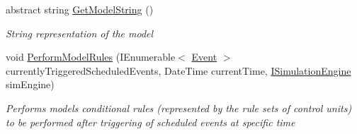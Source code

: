 \begin{DoxyCompactItemize}
abstract string \hyperlink{class_simulation_core_1_1_simulation_classes_1_1_simulation_model_a69e1261633e1d8c0a80bb456236ed9a0}{Get\+Model\+String} ()
\begin{DoxyCompactList}\small\item\em String representation of the model \end{DoxyCompactList}\item 
void \hyperlink{class_simulation_core_1_1_simulation_classes_1_1_simulation_model_a3c3eb18d13130c4e6e77abdf0594b8ae}{Perform\+Model\+Rules} (I\+Enumerable$<$ \hyperlink{class_simulation_core_1_1_h_c_c_m_elements_1_1_event}{Event} $>$ currently\+Triggered\+Scheduled\+Events, Date\+Time current\+Time, \hyperlink{interface_simulation_core_1_1_simulation_classes_1_1_i_simulation_engine}{I\+Simulation\+Engine} sim\+Engine)
\begin{DoxyCompactList}\small\item\em Performs model\textquotesingle{}s conditional rules (represented by the rule sets of control units) to be performed after triggering of scheduled events at specific time \end{DoxyCompactList}\end{DoxyCompactItemize}
